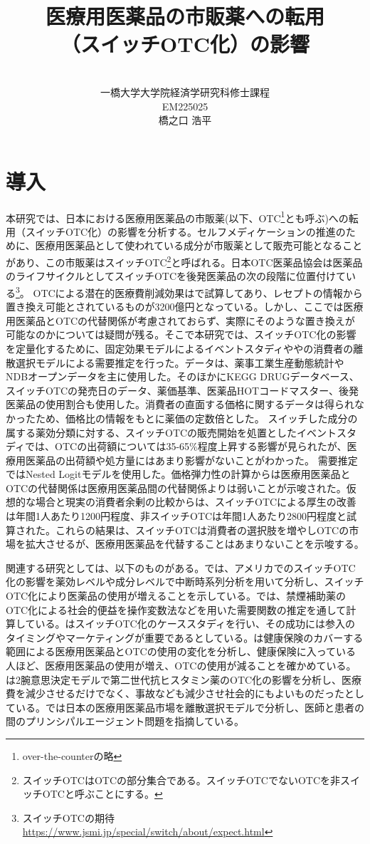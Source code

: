 \documentclass[a4paper,11pt,uplatex]{jsarticle}
\title{\huge 医療用医薬品の市販薬への転用\\（スイッチOTC化）の影響}
\author{\vspace{14cm}\\
一橋大学大学院経済学研究科修士課程\\
EM225025\\
橋之口 浩平}
\date{}
\theoremstyle{definition}
\begin{document}
\thispagestyle{empty}
\maketitle{}
\setcounter{page}{1}
\section{導入}
本研究では、日本における医療用医薬品の市販薬(以下、OTC\footnote{over-the-counterの略}とも呼ぶ)への転用（スイッチOTC化）の影響を分析する。セルフメディケーションの推進のために、医療用医薬品として使われている成分が市販薬として販売可能となることがあり、この市販薬はスイッチOTC\footnote{スイッチOTCはOTCの部分集合である。スイッチOTCでないOTCを非スイッチOTCと呼ぶことにする。}と呼ばれる。日本OTC医薬品協会は医薬品のライフサイクルとしてスイッチOTCを後発医薬品の次の段階に位置付けている\footnote{スイッチOTCの期待\url{https://www.jsmi.jp/special/switch/about/expect.html}}。
OTCによる潜在的医療費削減効果は\cite{igarashi2021}で試算してあり、レセプトの情報から置き換え可能とされているものが3200億円となっている。しかし、ここでは医療用医薬品とOTCの代替関係が考慮されておらず、実際にそのような置き換えが可能なのかについては疑問が残る。そこで本研究では、スイッチOTC化の影響を定量化するために、固定効果モデルによるイベントスタディや\cite{Berry1994}や\cite{BLP}の消費者の離散選択モデルによる需要推定を行った。データは、薬事工業生産動態統計やNDBオープンデータを主に使用した。そのほかにKEGG DRUGデータベース、スイッチOTCの発売日のデータ、薬価基準、医薬品HOTコードマスター、後発医薬品の使用割合も使用した。消費者の直面する価格に関するデータは得られなかったため、価格比の情報をもとに薬価の定数倍とした。
スイッチした成分の属する薬効分類に対する、スイッチOTCの販売開始を処置としたイベントスタディでは、OTCの出荷額については35-65\%程度上昇する影響が見られたが、医療用医薬品の出荷額や処方量にはあまり影響がないことがわかった。
需要推定ではNested Logitモデルを使用した。価格弾力性の計算からは医療用医薬品とOTCの代替関係は医療用医薬品間の代替関係よりは弱いことが示唆された。仮想的な場合と現実の消費者余剰の比較からは、スイッチOTCによる厚生の改善は年間1人あたり1200円程度、非スイッチOTCは年間1人あたり2800円程度と試算された。これらの結果は、スイッチOTCは消費者の選択肢を増やしOTCの市場を拡大させるが、医療用医薬品を代替することはあまりないことを示唆する。

関連する研究としては、以下のものがある。\cite{Stomberg2013}では、アメリカでのスイッチOTC化の影響を薬効レベルや成分レベルで中断時系列分析を用いて分析し、スイッチOTC化により医薬品の使用が増えることを示している。\cite{Keeler2002}では、禁煙補助薬のOTC化による社会的便益を操作変数法などを用いた需要関数の推定を通して計算している。\cite{Mahecha2006}はスイッチOTC化のケーススタディを行い、その成功には参入のタイミングやマーケティングが重要であるとしている。\cite{medicare1995}は健康保険のカバーする範囲による医療用医薬品とOTCの使用の変化を分析し、健康保険に入っている人ほど、医療用医薬品の使用が増え、OTCの使用が減ることを確かめている。\cite{medicare2003}は2腕意思決定モデルで第二世代抗ヒスタミン薬のOTC化の影響を分析し、医療費を減少させるだけでなく、事故なども減少させ社会的にもよいものだったとしている。\cite{Iizuka2007}では日本の医療用医薬品市場を離散選択モデルで分析し、医師と患者の間のプリンシパルエージェント問題を指摘している。
\end{document}
